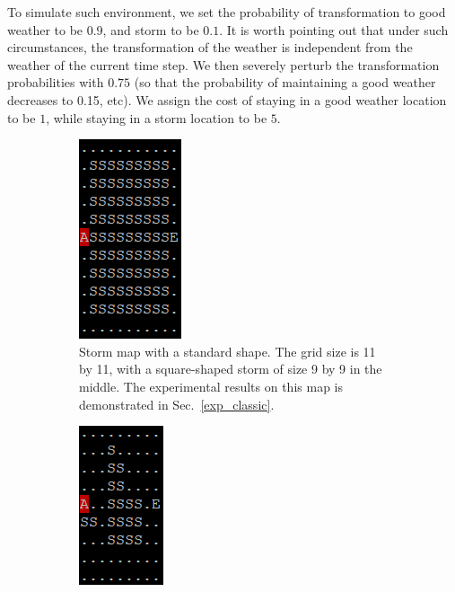 \documentclass[11pt,reqno]{amsart}
\theoremstyle{definition}
\numberwithin{equation}{section}
\theoremstyle{remark}
\begin{document}
\medskip

To simulate such environment, we set the probability of transformation to good weather to be $0.9$, and storm to be $0.1$. It is worth pointing out that under such circumstances, the transformation of the weather is independent from the weather of the current time step. We then severely perturb the transformation probabilities with $0.75$ (so that the probability of maintaining a good weather decreases to 0.15, etc). We assign the cost of staying in a good weather location to be $1$, while staying in a storm location to be $5$. 

\begin{figure}
\centering
\begin{subfigure}{0.5\linewidth}
    \centering
    \includegraphics[width=0.4\linewidth]{images/storm_map_classic.png}
    \caption{Storm map with a standard shape. The grid size is 11 by 11, with a square-shaped storm of size 9 by 9 in the middle. The experimental results on this map is demonstrated in Sec.~\ref{exp_classic}.}
    \label{exp_maps_classic}
\end{subfigure}%
\begin{subfigure}{0.5\linewidth}
    \centering
    \includegraphics[width=0.415\linewidth]{images/storm_map_normal.png}

\end{subfigure}
\end{figure}
\end{document}
